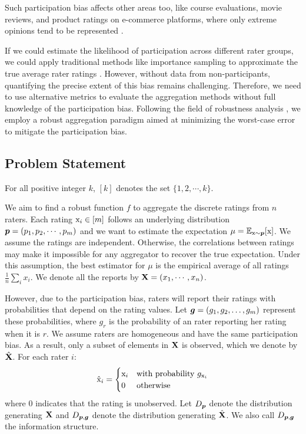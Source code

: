 Such participation bias affects other areas too, like course evaluations, movie reviews, and product ratings on e-commerce platforms, where only extreme opinions tend to be represented \cite{hu2009online,koh2010online,bhole2017effectiveness,zhu2022bias}.


If we could estimate the likelihood of participation across different rater groups, we could apply traditional methods like importance sampling to approximate the true average rater ratings \cite{tokdar2010importance,tabandeh2022review,vogel2020weighted}. However, without data from non-participants, quantifying the precise extent of this bias remains challenging. Therefore, we need to use alternative metrics to evaluate the aggregation methods without full knowledge of the participation bias. Following the field of robustness analysis \cite{arieli2018robust}, we employ a robust aggregation paradigm aimed at minimizing the worst-case error to mitigate the participation bias. 

\subsection{Problem Statement}
For all positive integer $k$, $[k]$ denotes the set $\{1,2,\cdots,k\}$.\ 

We aim to find a robust function $f$ to aggregate the discrete ratings from $n$ raters. Each rating ${\textnormal{x}}_i\in [m]$ follows an underlying distribution ${\bm{p}}=(p_1,p_2,\cdots,p_m)$ and we want to estimate the expectation $\mu=\mathbb{E}_{{\textnormal{x}}\sim{\bm{p}}}[{\textnormal{x}}]$. We assume the ratings are independent. Otherwise, the correlations between ratings may make it impossible for any aggregator to recover the true expectation. Under this assumption, the best estimator for $\mu$ is the empirical average of all ratings $\frac{1}{n}\sum_i x_i$. We denote all the reports by ${\mathbf{X}}=(x_1,\cdots,x_n)$.

However, due to the participation bias, raters will report their ratings with probabilities that depend on the rating values. Let \({\bm{g}} = (g_1, g_2, \dots, g_m)\) represent these probabilities, where \(g_{r}\) is the probability of an rater reporting her rating when it is \(r\). We assume raters are homogeneous and have the same participation bias. As a result, only a subset of elements in \({\mathbf{X}}\) is observed, which we denote by \(\hat{{\mathbf{X}}}\). For each rater \(i\):
\[
\hat{{\textnormal{x}}}_i = 
\begin{cases}
{{\textnormal{x}}}_i & \text{with probability } g_{{{\textnormal{x}}}_i} \\
0 & \text{otherwise}
\end{cases}
\]
where \(0\) indicates that the rating is unobserved. Let $D_{{\bm{p}}}$ denote the distribution generating ${\mathbf{X}}$ and $D_{{\bm{p}},{\bm{g}}}$ denote the distribution generating $\hat{{\mathbf{X}}}$. We also call $D_{{\bm{p}},{\bm{g}}}$ the information structure.

